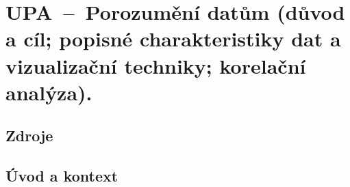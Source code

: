 

\graphicspath{{upa/porozumeni_datum/figures}}


\chapter{UPA~--~Porozumění datům (důvod a cíl; popisné charakteristiky dat a vizualizační techniky; korelační analýza).}


\section{Zdroje}

\begin{compactitem}
    \item {}
\end{compactitem}


\section{Úvod a kontext}

